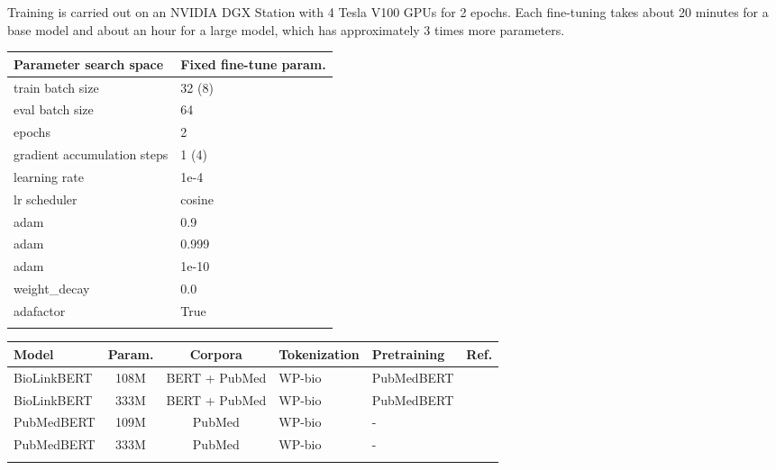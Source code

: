 \documentclass{bioinfo}
\begin{document}
\begin{methods}
Training is carried out on an NVIDIA DGX Station with 4 Tesla V100 GPUs for 2 epochs. Each fine-tuning takes about 20 minutes for a base model and about an hour for a large model, which has approximately 3 times more parameters. 

\begin{table}[]
 {\begin{tabular}{@{}ll@{}}\toprule
Parameter search space           & Fixed fine-tune param.\\\midrule
train batch size                 & 32 (8)               \\
eval batch size                  & 64                   \\
epochs                           & 2                    \\
gradient accumulation steps      & 1 (4)                \\
learning rate                    & 1e-4                 \\
lr scheduler                     & cosine               \\
adam                    & 0.9                  \\
adam                    & 0.999                \\
adam                   & 1e-10                \\
weight\_decay                    & 0.0                  \\
adafactor                        & True                 \\\botrule
\end{tabular}
}{}
\end{table}

\begin{table*}[]
 {\begin{tabular}{@{}lcclll@{}}\toprule \textbf{Model}              & \textbf{Param.}  & \textbf{Corpora}                                & \textbf{Tokenization}  & \textbf{Pretraining}         & \textbf{Ref.}\\\midrule
BioLinkBERT        & 108M                & BERT + PubMed                           & WP-bio            & PubMedBERT                      & \cite{biolinkbert}\\
BioLinkBERT       & 333M                & BERT + PubMed                           & WP-bio            & PubMedBERT                      & \cite{biolinkbert}\\
PubMedBERT     & 109M                & PubMed                                          & WP-bio            & -                               & \cite{pubmedbert}\\
PubMedBERT     & 333M                & PubMed                                          & WP-bio            & -                               & \cite{pubmedbert}\\\botrule
\end{tabular}}{}
\end{table*}


\end{methods}
\end{document}

